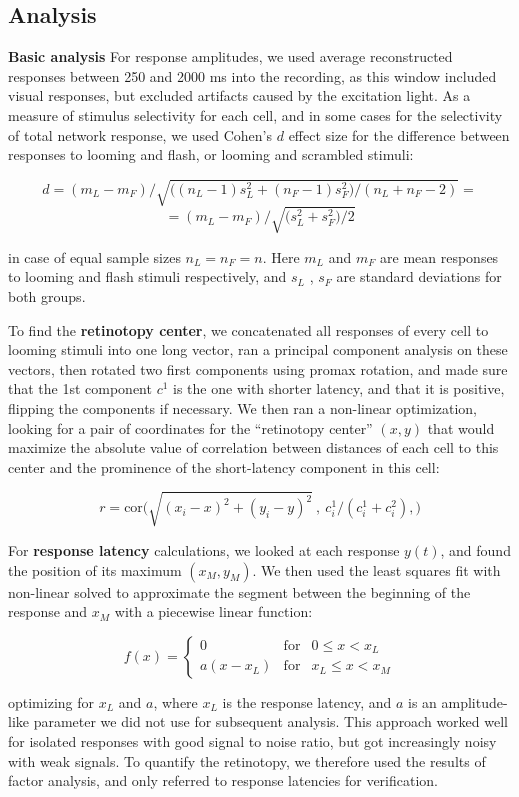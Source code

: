 \documentclass{article}
\begin{document}
\subsection*{Analysis}

\textbf{Basic analysis} For response amplitudes, we used average reconstructed responses between 250 and 2000 ms into the recording, as this window included visual responses, but excluded artifacts caused by the excitation light. As a measure of stimulus selectivity for each cell, and in some cases for the selectivity of total network response, we used Cohen’s $d$ effect size for the difference between responses to looming and flash, or looming and scrambled stimuli:

\[ d = (m_L-m_F)/ \sqrt{ \big((n_L-1) s^2_L + (n_F-1) s^2_F)/(n_L + n_F - 2)} = \]
\[ =(m_L-m_F)/\sqrt{\big(s^2_L+s^2_F\big)/2} \]

in case of equal sample sizes $n_L=n_F=n$. Here $m_L$ and $m_F$ are mean responses to looming and flash stimuli respectively, and $s_L$ , $s_F$ are standard deviations for both groups.

To find the \textbf{retinotopy center}, we concatenated all responses of every cell to looming stimuli into one long vector, ran a principal component analysis on these vectors, then rotated two first components using promax rotation, and made sure that the 1st component $c^1$ is the one with shorter latency, and that it is positive, flipping the components if necessary. We then ran a non-linear optimization, looking for a pair of coordinates for the “retinotopy center” $(x,y)$ that would maximize the absolute value of correlation between distances of each cell to this center and the prominence of the short-latency component in this cell:

\[ r = \text{cor}\big(\sqrt{(x_i-x)^2+(y_i-y)^2}\ ,\ c^1_i/(c^1_i + c^2_i), \big) \]

For \textbf{response latency} calculations, we looked at each response $y(t)$, and found the position of its maximum $(x_M, y_M)$. We then used the least squares fit with non-linear solved to approximate the segment between the beginning of the response and $x_M$ with a piecewise linear function:

\[ f(x) = \left \{ \begin{array}{cll} 0 & \text{for} & 0 \leqslant x<x_L \\
a (x-x_L) & \text{for} & x_L\leqslant x < x_M \end{array} \right. \]

optimizing for $x_L$ and $a$, where $x_L$ is the response latency, and $a$ is an amplitude-like parameter we did not use for subsequent analysis. This approach worked well for isolated responses with good signal to noise ratio, but got increasingly noisy with weak signals. To quantify the retinotopy, we therefore used the results of factor analysis, and only referred to response latencies for verification.
\end{document}
